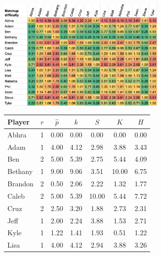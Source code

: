 \documentclass[letterpaper, 10 pt, conference]{ieeeconf}  %
\begin{document}
\begin{figure}[hb]
        \centering
        \begin{subfigure}[h]{0.5\textwidth}
                \centering
                \includegraphics[width=0.9\textwidth]{fig/difficulty_4.png}
        \end{subfigure}
        \begin{subfigure}[h]{0.4\textwidth}
                \footnotesize
                \centering
                \begin{tabular}{lccc|ccc}
                        \toprule
                        Player  & $r$   & $\hat{p}$ & $k$ & $S$ & $K$ & $H$ \\
                        \midrule
                        Abhra	& 1	& 0.00	& 0.00 & 0.00 & 0.00 & 0.00 \\
                        Adam	& 1	& 4.00	& 4.12 & 2.98 & 3.88 & 3.43 \\
                        Ben	& 2	& 5.00	& 5.39 & 2.75 & 5.44 & 4.09 \\
                        Bethany	& 1	& 9.00	& 9.06 & 3.51 & 10.00 & 6.75 \\
                        Brandon	& 2	& 0.50	& 2.06 & 2.22 & 1.32 & 1.77 \\
                        Caleb	& 2	& 5.00	& 5.39 & 10.00 & 5.44 & 7.72 \\
                        Cruz	& 2	& 2.50	& 3.20 & 1.88 & 2.73 & 2.31 \\
                        Jeff	& 1	& 2.00  & 2.24 & 3.88 & 1.53 & 2.71 \\
                        Kyle	& 1	& 1.22	& 1.41 & 1.93 & 0.51 & 1.22 \\
                        Lisa	& 1	& 4.00  & 4.12 & 2.94 & 3.88 & 3.26 \\

\end{tabular}
\end{subfigure}
\end{figure}
\end{document}
